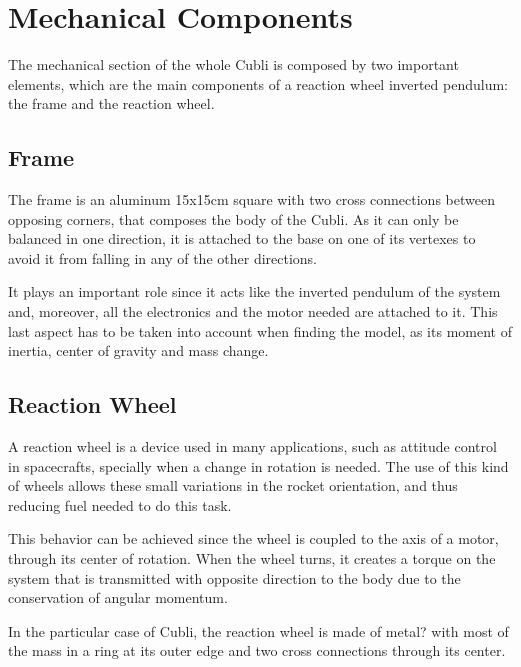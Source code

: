 \section{Mechanical Components}
The mechanical section of the whole Cubli is composed by two important elements, which are the main components of a reaction wheel inverted pendulum: the frame and the reaction wheel.

\subsection{Frame}
The frame is an aluminum 15x15cm square with two cross connections between opposing corners, that composes the body of the Cubli. As it can only be balanced in one direction, it is attached to the base on one of its vertexes to avoid it from falling in any of the other directions.

It plays an important role since it acts like the inverted pendulum of the system and, moreover, all the electronics and the motor needed are attached to it. This last aspect has to be taken into account when finding the model, as its moment of inertia, center of gravity and mass change.

\subsection{Reaction Wheel}
A reaction wheel is a device used in many applications, such as attitude control in spacecrafts, specially when a change in rotation is needed. The use of this kind of wheels allows these small variations in the rocket orientation, and thus reducing fuel needed to do this task.

 This behavior can be achieved since the wheel is coupled to the axis of a motor, through its center of rotation. When the wheel turns, it creates a torque on the system that is transmitted with opposite direction to the body due to the conservation of angular momentum.

In the particular case of Cubli, the reaction wheel is made of metal?  with most of the mass in a ring at its outer edge and two cross connections through its center.
